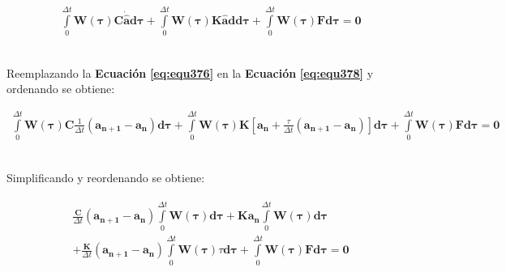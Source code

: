 \begin{ceqn} %
\begin{gather}\label{eq:equ378}
 \int\limits_0^{\Delta t} \mathbf{W(\tau)}\mathbf{C}\mathbf{\dot{\hat{a}}}\mathbf{d\tau} + \int\limits_0^{\Delta t} \mathbf{W(\tau)}\mathbf{K}\mathbf{\hat{a}}\mathbf{dd\tau} +  \int\limits_0^{\Delta t} \mathbf{W(\tau)}\mathbf{F}\mathbf{d\tau}  = \mathbf{0}
\end{gather}   
\end{ceqn}
\\
Reemplazando la \textbf{Ecuación} \textbf{\ref{eq:equ376}} en la \textbf{Ecuación} \textbf{\ref{eq:equ378}} y ordenando se obtiene:

\begin{ceqn} %
\begin{gather}\label{eq:equ379}
\int\limits_0^{\Delta t} \mathbf{W(\tau)}\mathbf{C}\frac{1}{\Delta t}(\mathbf{a_{n+1}} - \mathbf{a_n})\mathbf{d\tau} + \int\limits_0^{\Delta t} \mathbf{W(\tau)}\mathbf{K}\left[\mathbf{a_n} + \frac{\tau}{\Delta t}(\mathbf{a_{n+1}} - \mathbf{a_n}) \right]\mathbf{d\tau} +  \int\limits_0^{\Delta t} \mathbf{W(\tau)}\mathbf{F}\mathbf{d\tau}  = \mathbf{0}
\end{gather}   
\end{ceqn}
\\
Simplificando y reordenando se obtiene:

\begin{ceqn} 
\begin{gather} \label{eq:equ380} 
\begin{multlined}
\frac{\mathbf{C}}{\Delta t}(\mathbf{a_{n+1}} - \mathbf{a_n})\int\limits_0^{\Delta t} \mathbf{W(\tau)}\mathbf{d\tau} + \mathbf{K}\mathbf{a_n}\int\limits_0^{\Delta t} \mathbf{W(\tau)}\mathbf{d\tau}\\[12pt] 
+ \frac{\mathbf{K}}{\Delta t}(\mathbf{a_{n+1}} - \mathbf{a_n})\int\limits_0^{\Delta t} \mathbf{W(\tau)}\tau\mathbf{d\tau} +  \int\limits_0^{\Delta t} \mathbf{W(\tau)}\mathbf{F}\mathbf{d\tau}  = \mathbf{0}
\end{multlined}
\end{gather} 
\end{ceqn}


